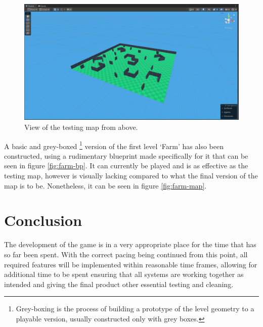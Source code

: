 \documentclass[11pt]{article}
\begin{document}
\begin{figure}[htb] 
    \centering
    \includegraphics[width=\columnwidth]{testing-map}
    \caption{View of the testing map from above.}
    \label{fig:testing-map}
\end{figure}

A basic and grey-boxed \footnote{Grey-boxing is the process of building a prototype of the level
geometry to a playable version, usually constructed only with grey boxes.} version of the first
level ‘Farm’ has also been constructed, using a rudimentary blueprint made specifically for it that
can be seen in figure \ref{fig:farm-bp}. It can currently be played and is as effective as the
testing map, however is visually lacking compared to what the final version of the map is to be.
Nonetheless, it can be seen in figure \ref{fig:farm-map}. \\

\section{Conclusion}
The development of the game is in a very appropriate place for the time that has so far been spent.
With the correct pacing being continued from this point, all required features will be implemented
within reasonable time frames, allowing for additional time to be spent ensuring that all systems
are working together as intended and giving the final product other essential testing and
cleaning. \\

\clearpage


\appendix
\end{document}
